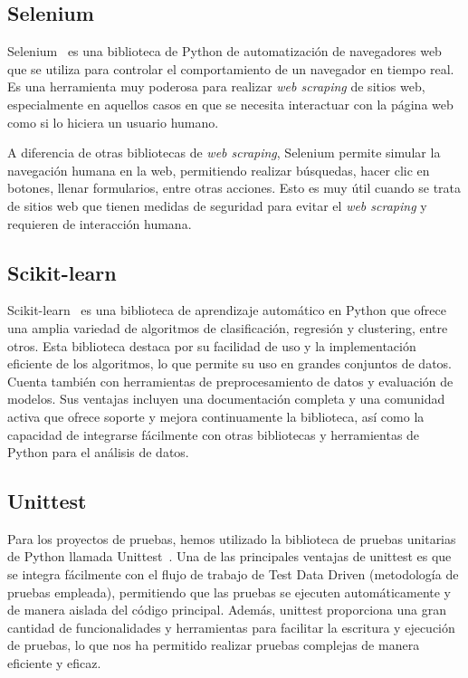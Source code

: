 \subsection{Selenium}

Selenium~\cite{selenium} es una biblioteca de Python de automatización de navegadores web que se utiliza para controlar el comportamiento de un navegador en tiempo real. Es una herramienta muy poderosa para realizar \textit{web scraping} de sitios web, especialmente en aquellos casos en que se necesita interactuar con la página web como si lo hiciera un usuario humano.

A diferencia de otras bibliotecas de \textit{web scraping}, Selenium permite simular la navegación humana en la web, permitiendo realizar búsquedas, hacer clic en botones, llenar formularios, entre otras acciones. Esto es muy útil cuando se trata de sitios web que tienen medidas de seguridad para evitar el \textit{web scraping} y requieren de interacción humana.

\subsection{Scikit-learn}

Scikit-learn~\cite{scikit} es una biblioteca de aprendizaje automático en Python que ofrece una amplia variedad de algoritmos de clasificación, regresión y clustering, entre otros. Esta biblioteca destaca por su facilidad de uso y la implementación eficiente de los algoritmos, lo que permite su uso en grandes conjuntos de datos. Cuenta también con herramientas de preprocesamiento de datos y evaluación de modelos. Sus ventajas incluyen una documentación completa y una comunidad activa que ofrece soporte y mejora continuamente la biblioteca, así como la capacidad de integrarse fácilmente con otras bibliotecas y herramientas de Python para el análisis de datos.

\subsection{Unittest}

Para los proyectos de pruebas, hemos utilizado la biblioteca de pruebas unitarias de Python llamada Unittest~\cite{unittest}. Una de las principales ventajas de unittest es que se integra fácilmente con el flujo de trabajo de Test Data Driven (metodología de pruebas empleada), permitiendo que las pruebas se ejecuten automáticamente y de manera aislada del código principal. Además, unittest proporciona una gran cantidad de funcionalidades y herramientas para facilitar la escritura y ejecución de pruebas, lo que nos ha permitido realizar pruebas complejas de manera eficiente y eficaz.


